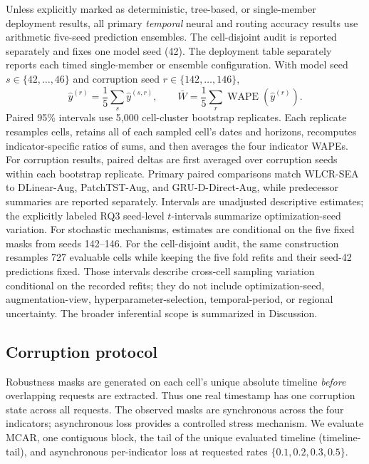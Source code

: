 \documentclass[10pt,conference,letterpaper]{IEEEtran}
\newcommand{\method}{WLCR-SEA}
\begin{document}
Unless explicitly marked as deterministic, tree-based, or single-member deployment results, all primary \emph{temporal} neural and routing accuracy results use arithmetic five-seed prediction ensembles. The cell-disjoint audit is reported separately and fixes one model seed (42). The deployment table separately reports each timed single-member or ensemble configuration. With model seed $s\in\{42,\ldots,46\}$ and corruption seed $r\in\{142,\ldots,146\}$,
\begin{equation}
\widehat y^{(r)}=\frac15\sum_s\widehat y^{(s,r)},\qquad
\bar W=\frac15\sum_r\operatorname{WAPE}(\widehat y^{(r)}).
\end{equation}
Paired 95\% intervals use 5,000 cell-cluster bootstrap replicates. Each replicate resamples cells, retains all of each sampled cell's dates and horizons, recomputes indicator-specific ratios of sums, and then averages the four indicator WAPEs. For corruption results, paired deltas are first averaged over corruption seeds within each bootstrap replicate. Primary paired comparisons match \method{} to DLinear-Aug, PatchTST-Aug, and GRU-D-Direct-Aug, while predecessor summaries are reported separately. Intervals are unadjusted descriptive estimates; the explicitly labeled RQ3 seed-level $t$-intervals summarize optimization-seed variation. For stochastic mechanisms, estimates are conditional on the five fixed masks from seeds 142--146. For the cell-disjoint audit, the same construction resamples 727 evaluable cells while keeping the five fold refits and their seed-42 predictions fixed. Those intervals describe cross-cell sampling variation conditional on the recorded refits; they do not include optimization-seed, augmentation-view, hyperparameter-selection, temporal-period, or regional uncertainty. The broader inferential scope is summarized in Discussion.

\subsection{Corruption protocol}
Robustness masks are generated on each cell's unique absolute timeline \emph{before} overlapping requests are extracted. Thus one real timestamp has one corruption state across all requests. The observed masks are synchronous across the four indicators; asynchronous loss provides a controlled stress mechanism. We evaluate MCAR, one contiguous block, the tail of the unique evaluated timeline (timeline-tail), and asynchronous per-indicator loss at requested rates $\{0.1,0.2,0.3,0.5\}$.
\end{document}
